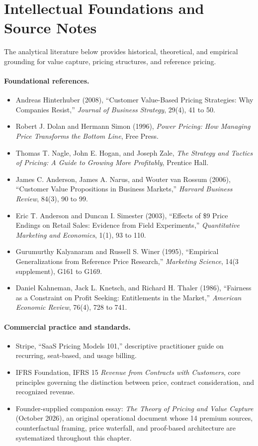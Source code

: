 \section*{Intellectual Foundations and Source Notes}

The analytical literature below provides historical, theoretical, and empirical grounding for value capture, pricing structures, and reference pricing.

\paragraph{Foundational references.}
\begin{itemize}
  \item Andreas Hinterhuber (2008), ``Customer Value-Based Pricing Strategies: Why Companies Resist,'' \emph{Journal of Business Strategy}, 29(4), 41 to 50.
  \item Robert J. Dolan and Hermann Simon (1996), \emph{Power Pricing: How Managing Price Transforms the Bottom Line}, Free Press.
  \item Thomas T. Nagle, John E. Hogan, and Joseph Zale, \emph{The Strategy and Tactics of Pricing: A Guide to Growing More Profitably}, Prentice Hall.
  \item James C. Anderson, James A. Narus, and Wouter van Rossum (2006), ``Customer Value Propositions in Business Markets,'' \emph{Harvard Business Review}, 84(3), 90 to 99.
  \item Eric T. Anderson and Duncan I. Simester (2003), ``Effects of \$9 Price Endings on Retail Sales: Evidence from Field Experiments,'' \emph{Quantitative Marketing and Economics}, 1(1), 93 to 110.
  \item Gurumurthy Kalyanaram and Russell S. Winer (1995), ``Empirical Generalizations from Reference Price Research,'' \emph{Marketing Science}, 14(3 supplement), G161 to G169.
  \item Daniel Kahneman, Jack L. Knetsch, and Richard H. Thaler (1986), ``Fairness as a Constraint on Profit Seeking: Entitlements in the Market,'' \emph{American Economic Review}, 76(4), 728 to 741.
\end{itemize}

\paragraph{Commercial practice and standards.}
\begin{itemize}
  \item Stripe, ``SaaS Pricing Models 101,'' descriptive practitioner guide on recurring, seat-based, and usage billing.
  \item IFRS Foundation, IFRS 15 \emph{Revenue from Contracts with Customers}, core principles governing the distinction between price, contract consideration, and recognized revenue.
  \item Founder-supplied companion essay: \emph{The Theory of Pricing and Value Capture} (October 2026), an original operational document whose 14 premium sources, counterfactual framing, price waterfall, and proof-based architecture are systematized throughout this chapter.
\end{itemize}

